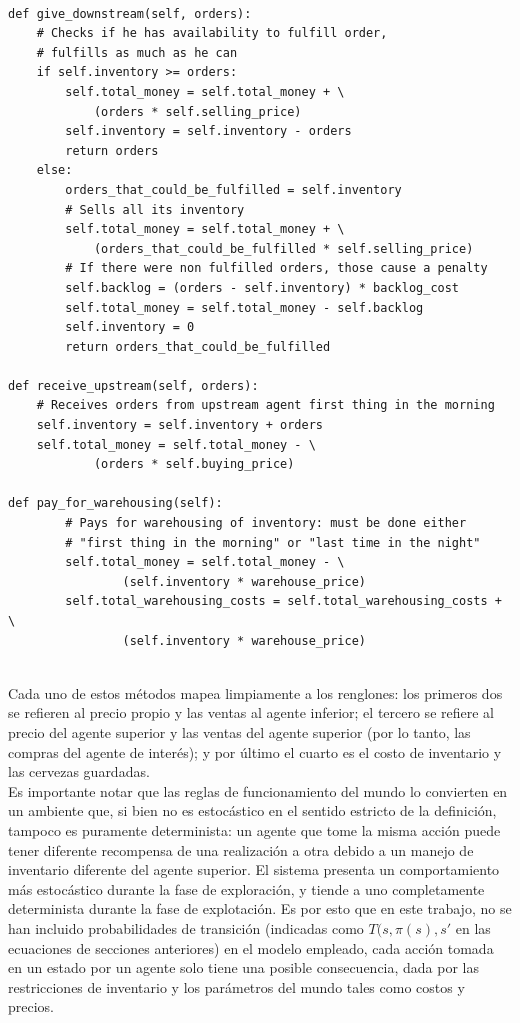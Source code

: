 \begin{verbatim}

def give_downstream(self, orders):
    # Checks if he has availability to fulfill order,
    # fulfills as much as he can
    if self.inventory >= orders:
        self.total_money = self.total_money + \
            (orders * self.selling_price)
        self.inventory = self.inventory - orders
        return orders
    else:
        orders_that_could_be_fulfilled = self.inventory
        # Sells all its inventory
        self.total_money = self.total_money + \
            (orders_that_could_be_fulfilled * self.selling_price)
        # If there were non fulfilled orders, those cause a penalty
        self.backlog = (orders - self.inventory) * backlog_cost
        self.total_money = self.total_money - self.backlog
        self.inventory = 0
        return orders_that_could_be_fulfilled

def receive_upstream(self, orders):
    # Receives orders from upstream agent first thing in the morning
    self.inventory = self.inventory + orders
    self.total_money = self.total_money - \
            (orders * self.buying_price)
     
def pay_for_warehousing(self):
        # Pays for warehousing of inventory: must be done either
        # "first thing in the morning" or "last time in the night"
        self.total_money = self.total_money - \
                (self.inventory * warehouse_price)
        self.total_warehousing_costs = self.total_warehousing_costs + \
                (self.inventory * warehouse_price)
                
\end{verbatim}

Cada uno de estos m\'etodos mapea limpiamente a los renglones: los primeros dos se refieren al precio propio y las ventas al agente inferior; el tercero se refiere al precio del agente superior y las ventas del agente superior (por lo tanto, las compras del agente de inter\'es); y por \'ultimo el cuarto es el costo de inventario y las cervezas guardadas.\\

Es importante notar que las reglas de funcionamiento del mundo lo convierten en un ambiente que, si bien no es estoc\'astico en el sentido estricto de la definici\'on, tampoco es puramente determinista: un agente que tome la misma acci\'on puede tener diferente recompensa de una realizaci\'on a otra debido a un manejo de inventario diferente del agente superior. El sistema  presenta un comportamiento m\'as estoc\'astico durante la fase de exploraci\'on, y tiende a uno completamente determinista durante la fase de explotaci\'on. Es por esto que en este trabajo, no se han incluido probabilidades de transici\'on (indicadas como $T(s, \pi(s), s'$ en las ecuaciones de secciones anteriores) en el modelo empleado, cada acci\'on tomada en un estado por un agente solo tiene una posible consecuencia, dada por las restricciones de inventario y los par\'ametros del mundo tales como costos y precios.\\

